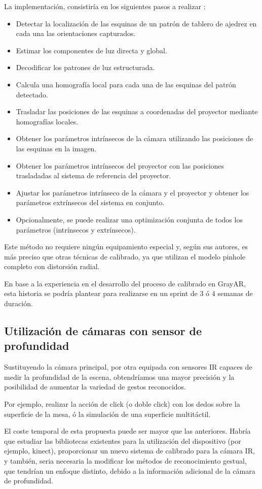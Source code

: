 La implementación, consistiría en los siguientes pasos a realizar \cite{Moreno}:
\begin{itemize}
\item Detectar la localización de las esquinas de un patrón de tablero de ajedrez en cada una las orientaciones capturados.
\item Estimar los componentes de luz directa y global.
\item Decodificar los patrones de luz estructurada.
\item Calcula una homografía local para cada una de las esquinas del patrón detectado.
\item Trasladar las posiciones de las esquinas a coordenadas del proyector mediante homografías locales.
\item Obtener los parámetros intrínsecos de la cámara utilizando las posiciones de las esquinas en la imagen.
\item Obtener los parámetros intrínsecos del proyector con las posiciones trasladadas al sistema de referencia del proyector.
\item Ajustar los parámetros intrínseco de la cámara y el proyector y obtener los parámetros extrínsecos del sistema en conjunto.
\item Opcionalmente, se puede realizar una optimización conjunta de todos los parámetros (intrínsecos y extrínsecos).
\end{itemize}

Este método no requiere ningún equipamiento especial y, según sus autores, es más preciso que otras técnicas de calibrado, ya que utilizan el modelo pinhole completo con distorsión radial. 

En base a la experiencia en el desarrollo del proceso de calibrado en GrayAR, esta historia se podría plantear para realizarse en un sprint de 3 ó 4 semanas de duración.  

\subsection{Utilización de cámaras con sensor de profundidad} 

Sustituyendo la cámara principal, por otra equipada con sensores IR capaces de medir la profundidad de la escena, obtendríamos una mayor precisión y la posibilidad de aumentar la variedad de gestos reconocidos. 

Por ejemplo, realizar la acción de click (o doble click) con los dedos sobre la superficie de la mesa, ó la simulación de una superficie multitáctil.

El coste temporal de esta propuesta puede ser mayor que las anteriores. Habría que estudiar las bibliotecas existentes para la utilización del dispositivo (por ejemplo, kinect), proporcionar un nuevo sistema de calibrado para la cámara IR, y también, seria necesaria la modificar los métodos de reconocimiento gestual, que tendrían un enfoque distinto, debido a la información adicional de la cámara de profundidad.